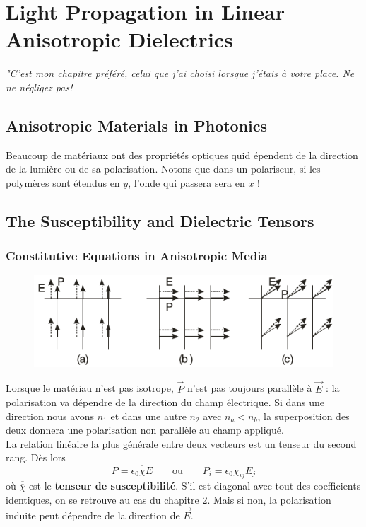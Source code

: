 \chapter{Light Propagation in Linear Anisotropic Dielectrics}
\textit{"C'est mon chapitre préféré, celui que j'ai choisi lorsque j'étais à votre place. Ne ne négligez pas!}

\section{Anisotropic Materials in Photonics}
Beaucoup de matériaux ont des propriétés optiques quid épendent de la direction de la lumière ou de sa polarisation. 
Notons que dans un polariseur, si les polymères sont étendus en $y$, l'onde qui passera sera en $x$ !

\section{The Susceptibility and Dielectric Tensors}
\subsection{Constitutive Equations in Anisotropic Media}
	\begin{figure}
	\includegraphics[scale=0.4]{ch4/image1.png}
	\end{figure}
Lorsque le matériau n'est pas isotrope, $\vec{P}$ n'est pas toujours parallèle à $\vec{E}$ : la polarisation va
dépendre de la direction du champ électrique. Si dans une direction nous avons $n_1$ et dans une autre $n_2$ 
avec $n_a<n_b$, la superposition des deux donnera une polarisation non parallèle au champ appliqué. \\

La relation linéaire la plus générale entre deux vecteurs est un tenseur du second rang. Dès lors
\begin{equation}
P = \epsilon_0\overline{\overline{\chi}}E\qquad\text{ou}\qquad P_i = \epsilon_0\chi_{ij}E_j
\end{equation}
où $\overline{\overline{\chi}}$ est le \textbf{tenseur de susceptibilité}. S'il est diagonal avec tout des 
coefficients identiques, on se retrouve au cas du chapitre 2. Mais si non, la polarisation induite peut dépendre
de la direction de $\vec{E}$.


